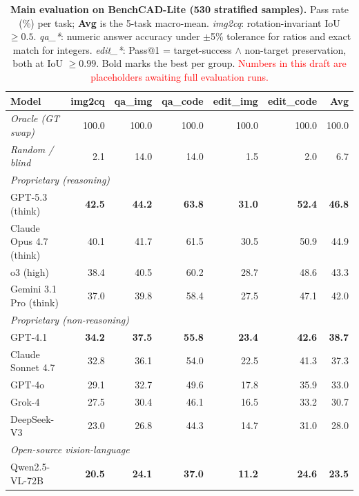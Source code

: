 \iffalse
\begin{table}[t]
\centering
\small
\setlength{\tabcolsep}{4pt}
\caption{\textbf{Main evaluation on BenchCAD-Lite (530 stratified samples).} Pass rate (\%) per task; \textbf{Avg} is the 5-task macro-mean. \emph{img2cq}: rotation-invariant IoU $\geq 0.5$. \emph{qa\_*}: numeric answer accuracy under $\pm$5\% tolerance for ratios and exact match for integers. \emph{edit\_*}: Pass@1 = target-success $\wedge$ non-target preservation, both at IoU $\geq 0.99$. Bold marks the best per group. \textcolor{red}{Numbers in this draft are placeholders awaiting full evaluation runs.}}
\label{tab:main_eval}
\begin{tabular}{lrrrrrr}
\toprule
Model & img2cq & qa\_img & qa\_code & edit\_img & edit\_code & \textbf{Avg} \\
\midrule
\textit{Oracle (GT swap)}    & 100.0 & 100.0 & 100.0 & 100.0 & 100.0 & 100.0 \\
\textit{Random / blind}      & 2.1 & 14.0 & 14.0 & 1.5 & 2.0 & 6.7 \\
\midrule
\multicolumn{7}{l}{\emph{Proprietary (reasoning)}} \\
GPT-5.3 (think)                & \textbf{42.5} & \textbf{44.2} & \textbf{63.8} & \textbf{31.0} & \textbf{52.4} & \textbf{46.8} \\
Claude Opus 4.7 (think)      & 40.1 & 41.7 & 61.5 & 30.5 & 50.9 & 44.9 \\
o3 (high)                    & 38.4 & 40.5 & 60.2 & 28.7 & 48.6 & 43.3 \\
Gemini 3.1 Pro (think)       & 37.0 & 39.8 & 58.4 & 27.5 & 47.1 & 42.0 \\
\midrule
\multicolumn{7}{l}{\emph{Proprietary (non-reasoning)}} \\
GPT-4.1                      & \textbf{34.2} & \textbf{37.5} & \textbf{55.8} & \textbf{23.4} & \textbf{42.6} & \textbf{38.7} \\
Claude Sonnet 4.7            & 32.8 & 36.1 & 54.0 & 22.5 & 41.3 & 37.3 \\
GPT-4o                       & 29.1 & 32.7 & 49.6 & 17.8 & 35.9 & 33.0 \\
Grok-4                       & 27.5 & 30.4 & 46.1 & 16.5 & 33.2 & 30.7 \\
DeepSeek-V3                  & 23.0 & 26.8 & 44.3 & 14.7 & 31.0 & 28.0 \\
\midrule
\multicolumn{7}{l}{\emph{Open-source vision-language}} \\
Qwen2.5-VL-72B               & \textbf{20.5} & \textbf{24.1} & \textbf{37.0} & \textbf{11.2} & \textbf{24.6} & \textbf{23.5} \\

\end{tabular}
\end{table}
